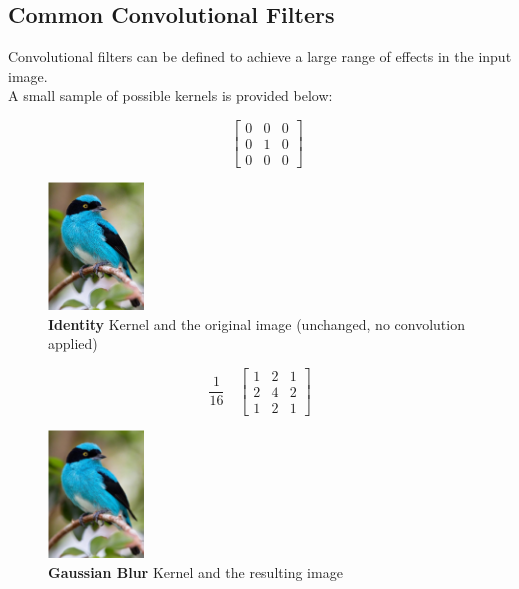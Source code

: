 \subsection{Common Convolutional Filters}
\label{sec:convolution:convolutionalfilters:commonconvolutionalfilters}
Convolutional filters can be defined to achieve a large range of effects in the input image.\\
A small sample of possible kernels is provided below:
\begin{figure}[ht]
\begin{minipage}[b]{0.5\linewidth}
\centering
    $$
    \quad
    \begin{bmatrix} 
    0 & 0 & 0 \\
    0 & 1 & 0 \\
    0 & 0 & 0
    \end{bmatrix}
    $$
\caption{\textbf{Identity} Kernel and the original image (unchanged, no convolution applied)}
\end{minipage}
\begin{minipage}[b]{0.3\linewidth}
\centering
\includegraphics[width=1in]{graphics/convolution/Convolution_gebs_KernelIdentity.png}
\end{minipage}
\label{fig:Identity Kernel}
\end{figure}
\FloatBarrier
\begin{figure}[ht]
\begin{minipage}[b]{0.5\linewidth}
\centering
    $$
    \frac{1}{16}
    \quad
    \begin{bmatrix} 
    1 & 2 & 1 \\
    2 & 4 & 2 \\
    1 & 2 & 1
    \end{bmatrix}
    $$
\caption{\textbf{Gaussian Blur} Kernel and the resulting image}
\end{minipage}
\begin{minipage}[b]{0.3\linewidth}
\centering
\includegraphics[width=1in]{graphics/convolution/Convolution_gebs_KernelGaussianBlur3x3.png}
\end{minipage}
\label{fig:Gaussian Blur Kernel}
\end{figure}
